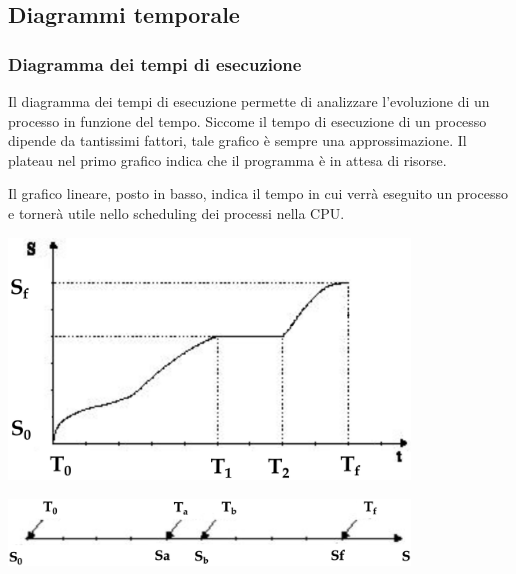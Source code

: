 \documentclass[a4paper]{article}
\begin{document}
\newpage


\subsection{Diagrammi temporale}
\subsubsection*{Diagramma dei tempi di esecuzione}
\begin{center}
	\begin{minipage}{0.59\textwidth}
		Il diagramma dei tempi di esecuzione permette di analizzare l'evoluzione di un processo in funzione del tempo. Siccome il
		tempo di esecuzione di un processo dipende da tantissimi fattori, tale grafico è sempre una approssimazione. Il plateau nel
		primo grafico indica che il programma è in attesa di risorse.
	
		Il grafico lineare, posto in basso, indica il tempo in cui verrà eseguito un processo e tornerà utile nello scheduling dei
		processi nella CPU.
	\end{minipage}
	\begin{minipage}{0.4\textwidth}
		\centering
		\includegraphics[width=0.8\textwidth]{diagramma temporale 1.png}
	
		\vspace{5pt}
		\includegraphics[width=0.8\textwidth]{diagramma temporale 2.png}
	\end{minipage}
\end{center}
\end{document}
